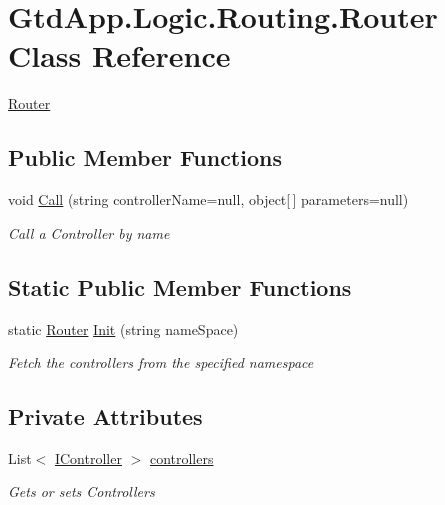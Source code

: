\hypertarget{class_gtd_app_1_1_logic_1_1_routing_1_1_router}{}\section{Gtd\+App.\+Logic.\+Routing.\+Router Class Reference}
\label{class_gtd_app_1_1_logic_1_1_routing_1_1_router}


\mbox{\hyperlink{class_gtd_app_1_1_logic_1_1_routing_1_1_router}{Router}}  


\subsection*{Public Member Functions}
\begin{DoxyCompactItemize}
\item 
void \mbox{\hyperlink{class_gtd_app_1_1_logic_1_1_routing_1_1_router_a01503f32282823f3e363f0255ba50c86}{Call}} (string controller\+Name=null, object\mbox{[}$\,$\mbox{]} parameters=null)
\begin{DoxyCompactList}\small\item\em Call a Controller by name \end{DoxyCompactList}\end{DoxyCompactItemize}
\subsection*{Static Public Member Functions}
\begin{DoxyCompactItemize}
\item 
static \mbox{\hyperlink{class_gtd_app_1_1_logic_1_1_routing_1_1_router}{Router}} \mbox{\hyperlink{class_gtd_app_1_1_logic_1_1_routing_1_1_router_a46a2fedb41623573e86f0a7d3139aefd}{Init}} (string name\+Space)
\begin{DoxyCompactList}\small\item\em Fetch the controllers from the specified namespace \end{DoxyCompactList}\end{DoxyCompactItemize}
\subsection*{Private Attributes}
\begin{DoxyCompactItemize}
\item 
List$<$ \mbox{\hyperlink{interface_gtd_app_1_1_logic_1_1_interfaces_1_1_i_controller}{I\+Controller}} $>$ \mbox{\hyperlink{class_gtd_app_1_1_logic_1_1_routing_1_1_router_ae44dda68d6febb0af417a68bae08956e}{controllers}}
\begin{DoxyCompactList}\small\item\em Gets or sets Controllers \end{DoxyCompactList}\end{DoxyCompactItemize}


